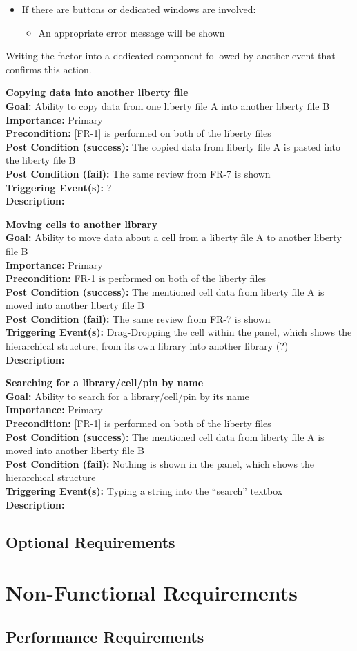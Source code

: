 \documentclass[10pt,a4paper]{report}
\newcommand{\FRDescription}[8]{
    \textbf{#1} \\
    \textbf{Goal: } #2 \\
    \textbf{Importance: } #3 \\
    \textbf{Precondition: } #4 \\
    \textbf{Post Condition (success): } #5 \\
    \textbf{Post Condition (fail): } #6 \\
    \textbf{Triggering Event(s): } #7 \\
    \textbf{Description: } \\ 
    #8}
\begin{document}
\begin{FR}
{\begin{itemize}
\begin{itemize}
            \item If there are buttons or dedicated windows are involved:
            \begin{itemize}
                \item An appropriate error message will be shown
            \end{itemize}
        \end{itemize}
    \end{itemize}}
    {Writing the factor into a dedicated component followed by another event that confirms this action.}
    \item \FRDescription{Copying data into another liberty file}
    {Ability to copy data from one liberty file A into another liberty file B}
    {Primary}
    {\ref{FR-1} is performed on both of the liberty files}
    {The copied data from liberty file A is pasted into the liberty file B}
    {The same review from FR-7 is shown}
    {?}
    \item \FRDescription{Moving cells to another library}
    {Ability to move data about a cell from a liberty file A to another liberty file B}
    {Primary}
    {FR-1 is performed on both of the liberty files}
    {The mentioned cell data from liberty file A is moved into another liberty file B}
    {The same review from FR-7 is shown}
    {Drag-Dropping the cell within the panel, which shows the hierarchical structure, from its own library into another library (?)}
    \item \FRDescription{Searching for a library/cell/pin by name}
    {Ability to search for a library/cell/pin by its name}
    {Primary}
    {\ref{FR-1} is performed on both of the liberty files}
    {The mentioned cell data from liberty file A is moved into another liberty file B}
    {Nothing is shown in the panel, which shows the hierarchical structure}
    {Typing a string into the “search” textbox}
\end{FR}
\subsection{Optional Requirements}
\section{Non-Functional Requirements}
\subsection{Performance Requirements}
\end{document}
